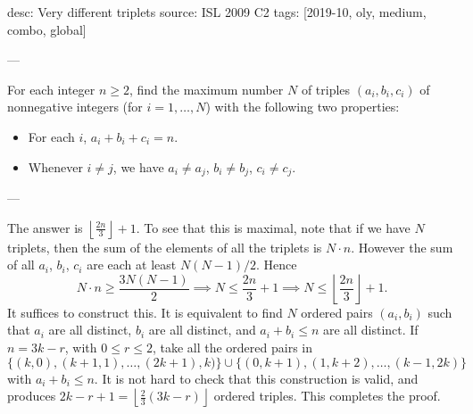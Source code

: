 desc: Very different triplets
source: ISL 2009 C2
tags: [2019-10, oly, medium, combo, global]

---

For each integer $n\ge2$, find the maximum number $N$ of triples $(a_i,b_i,c_i)$ of nonnegative integers (for $i=1,\ldots,N$) with the following two properties:
\begin{itemize}[itemsep=0em]
    \item For each $i$, $a_i+b_i+c_i=n$.
    \item Whenever $i\ne j$, we have $a_i\ne a_j$, $b_i\ne b_j$, $c_i\ne c_j$.
\end{itemize}

---

The answer is $\left\lfloor\frac{2n}3\right\rfloor+1$. To see that this is maximal, note that if we have $N$ triplets, then the sum of the elements of all the triplets is $N\cdot n$. However the sum of all $a_i$, $b_i$, $c_i$ are each at least $N(N-1)/2$. Hence \[N\cdot n\ge\frac{3N(N-1)}2\implies N\le\frac{2n}3+1\implies N\le\left\lfloor\frac{2n}3\right\rfloor+1.\]
It suffices to construct this. It is equivalent to find $N$ ordered pairs $(a_i,b_i)$ such that $a_i$ are all distinct, $b_i$ are all distinct, and $a_i+b_i\le n$ are all distinct. If $n=3k-r$, with $0\le r\le2$, take all the ordered pairs in $\{(k,0),(k+1,1),\ldots,(2k+1),k)\}\cup\{(0,k+1),(1,k+2),\ldots,(k-1,2k)\}$ with $a_i+b_i\le n$. It is not hard to check that this construction is valid, and produces $2k-r+1=\left\lfloor\frac23(3k-r)\right\rfloor$ ordered triples. This completes the proof.
